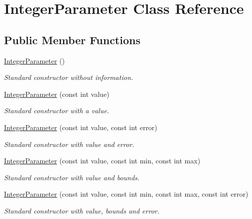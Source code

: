 \hypertarget{class_integer_parameter}{\section{Integer\-Parameter Class Reference}
\label{class_integer_parameter}
}
\subsection*{Public Member Functions}
\begin{DoxyCompactItemize}
\item 
\hyperlink{class_integer_parameter_a3b6c7d2cf7e6e405618c28477c4a6163}{Integer\-Parameter} ()
\begin{DoxyCompactList}\small\item\em Standard constructor without information. \end{DoxyCompactList}\item 
\hyperlink{class_integer_parameter_a342142d0c742fa3beb1c691cd2d6c4ad}{Integer\-Parameter} (const int value)
\begin{DoxyCompactList}\small\item\em Standard constructor with a value. \end{DoxyCompactList}\item 
\hyperlink{class_integer_parameter_aa9d240d2ba83905ffa1cfd9fe1b1c213}{Integer\-Parameter} (const int value, const int error)
\begin{DoxyCompactList}\small\item\em Standard constructor with value and error. \end{DoxyCompactList}\item 
\hyperlink{class_integer_parameter_ab71291d38ec332a26558ee01fae1985c}{Integer\-Parameter} (const int value, const int min, const int max)
\begin{DoxyCompactList}\small\item\em Standard constructor with value and bounds. \end{DoxyCompactList}\item 
\hyperlink{class_integer_parameter_a79d506e1eaaba1fd38d2b450d7c19667}{Integer\-Parameter} (const int value, const int min, const int max, const int error)
\begin{DoxyCompactList}\small\item\em Standard constructor with value, bounds and error. \end{DoxyCompactList}\item 

\end{DoxyCompactItemize}
